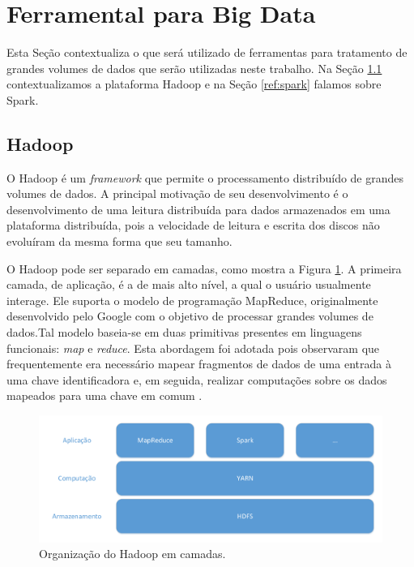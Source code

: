 \section{Ferramental para Big Data}

Esta Seção contextualiza o que será utilizado de ferramentas para 
tratamento de grandes volumes de dados que serão utilizadas neste trabalho. Na 
Seção \ref{ref:hadoop} contextualizamos a plataforma Hadoop e na Seção 
\ref{ref:spark} falamos sobre Spark.

\subsection{Hadoop} \label{ref:hadoop}

O Hadoop é um \emph{framework} que permite o processamento distribuído de 
grandes volumes de dados. A principal motivação de seu desenvolvimento é o desenvolvimento de uma
leitura distribuída para dados armazenados em uma plataforma distribuída, pois a velocidade de leitura e escrita
dos discos não evoluíram da mesma forma que seu tamanho.

O Hadoop pode ser separado em camadas, como mostra a Figura \ref{fig:hadoop}. A primeira camada, de aplicação, 
é a de mais alto nível, a qual o usuário usualmente interage. Ele suporta o modelo de programação MapReduce, originalmente
desenvolvido pelo Google com o objetivo de processar grandes volumes de dados.Tal modelo baseia-se em duas primitivas 
presentes em linguagens funcionais: \emph{map} e \emph{reduce}. Esta abordagem 
foi adotada pois observaram que frequentemente era necessário mapear fragmentos 
de dados de uma entrada à uma chave identificadora e, em seguida, realizar 
computações sobre os dados mapeados para uma chave em comum 
\cite{ref:mapreduce}.

\begin{figure}[H]
 \centerline{\includegraphics[width=1\textwidth]{./img/hadoop-layers.pdf}}
 \caption{Organização do Hadoop em camadas.}
 \label{fig:hadoop}
\end{figure}

